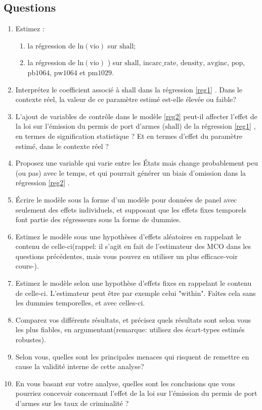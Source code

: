 \subsection{Questions}
\begin{enumerate}
\item Estimez : 
\begin{enumerate}
\item la régression de $\mathrm{ln(vio)}$ sur $\mathrm{shall}$;\label{reg1}
\item la régression de $\mathrm{ln(vio)}$ ) sur $\mathrm{shall}$, $\mathrm{incarc\_rate}$, $\mathrm{density}$, $\mathrm{avginc}$, $\mathrm{pop}$, $\mathrm{pb1064}$, $\mathrm{pw1064}$ et $\mathrm{pm1029}$\label{reg2}.
\end{enumerate}
\item Interprétez le coefficient associé à $\mathrm{shall}$ dans la régression \ref{reg1} . Dans le contexte
réel, la valeur de ce paramètre estimé est-elle élevée ou faible?
\item L'ajout de variables de contrôle dans le modèle \ref{reg2} peut-il affecter l'effet de la loi
sur l'émission du permis de port d'armes ($\mathrm{shall}$) de la régression \ref{reg1} , en termes
de signification statistique ? Et en termes d'effet du paramètre estimé, dans le
contexte réel ?
\item Proposez une variable qui varie entre les États mais change probablement peu (ou
pas) avec le temps, et qui pourrait générer un biais d'omission dans la régression \ref{reg2} .
\item Écrire le modèle sous la forme d'un modèle pour données de panel avec seulement des effets individuels, 
et supposant que les effets fixes temporels font partie des régresseurs sous la forme de dummies.
\item Estimez le modèle sous une hypothèses d'effets aléatoires en rappelant le contenu de celle-ci(rappel: il s'agit 
en fait de l'estimateur des MCO dans les questions précédentes, mais vous pouvez en utiliser un plus efficace-voir cours-).
\item Estimez le modèle selon une hypothèse d'effets fixes en rappelant le contenu de celle-ci. L'estimateur peut être par exemple celui "within".
 Faîtes cela sans les dummies temporelles, et avec celles-ci. 
 \item Comparez vos différents résultats,
et précisez quels résultats sont selon vous les plus fiables, en argumentant(remarque: utilisez des écart-types 
estimés robustes).
\item Selon vous, quelles sont les principales menaces qui risquent de remettre en cause la
validité interne de cette analyse?
\item En vous basant sur votre analyse, quelles sont les conclusions que 
vous pourriez concevoir concernant l'effet de la loi sur l'émission du permis de port d'armes sur les taux
de criminalité ?
\end{enumerate}


 

